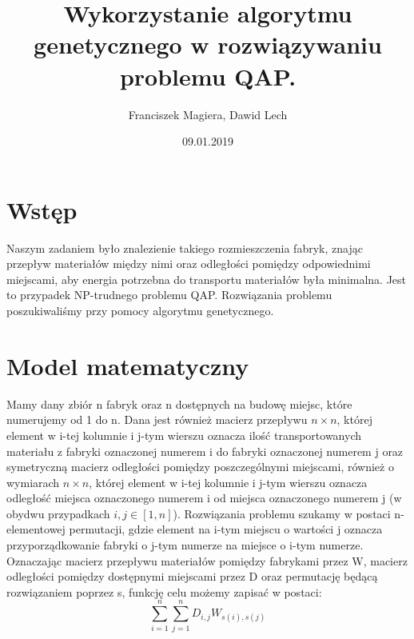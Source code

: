 \documentclass[12pt]{article}
\author{Franciszek Magiera, Dawid Lech}
\title{Wykorzystanie algorytmu genetycznego w rozwiązywaniu problemu QAP.}
\date{09.01.2019}
\begin{document}
\maketitle
\newpage
\tableofcontents
\newpage
\section{Wstęp}
Naszym zadaniem było znalezienie takiego rozmieszczenia fabryk, znając przepływ materiałów między nimi oraz odległości pomiędzy odpowiednimi miejscami, aby energia potrzebna do transportu materiałów była minimalna. Jest to przypadek NP-trudnego problemu QAP. Rozwiązania problemu poszukiwaliśmy przy pomocy algorytmu genetycznego.
\section{Model matematyczny}
Mamy dany zbiór n fabryk oraz n dostępnych na budowę miejsc, które numerujemy od 1 do n. Dana jest również macierz przepływu $n\times n$, której element w i-tej kolumnie i j-tym wierszu oznacza ilość transportowanych materiału z fabryki oznaczonej numerem i do fabryki oznaczonej numerem j oraz symetryczną macierz odległości pomiędzy poszczególnymi miejscami, również o wymiarach $n\times n$, której element w i-tej kolumnie i j-tym wierszu oznacza odległość miejsca oznaczonego numerem i od miejsca oznaczonego numerem j (w obydwu przypadkach $i,j \in [1,n]$). Rozwiązania problemu szukamy w postaci n-elementowej permutacji, gdzie element na i-tym miejscu o wartości j oznacza przyporządkowanie fabryki o j-tym numerze na miejsce o i-tym numerze. Oznaczając macierz przepływu materiałów pomiędzy fabrykami przez W, macierz odległości pomiędzy dostępnymi miejscami przez D oraz permutację będącą rozwiązaniem poprzez s, funkcję celu możemy zapisać w postaci:
\begin{equation}
\sum_{i=1}^{n}  \sum_{j=1}^{n}D_{i,j}W_{s(i), s(j)}
\label{Funkcja celu}
\end{equation}
\end{document}
